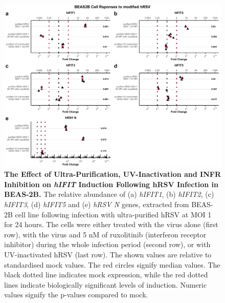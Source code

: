 \begin{figure}
    \centering
    \includegraphics[width=1\linewidth]{06. Chapter 1/Figs/01. Induction/10. beas2b_hrsv.pdf}
    \caption[The Effect of Ultra-Purification, UV-Inactivation and INFR Inhibition on \textit{hIFIT} Induction Following hRSV Infection in BEAS-2B.]{\textbf{The Effect of Ultra-Purification, UV-Inactivation and INFR Inhibition on \textit{hIFIT} Induction Following hRSV Infection in BEAS-2B.} The relative abundance of (a) \textit{hIFIT1}, (b) \textit{hIFIT2}, (c) \textit{hIFIT3}, (d) \textit{hIFIT5} and (e) \textit{hRSV N} genes, extracted from BEAS-2B cell line following infection with ultra-purified hRSV at MOI 1 for 24 hours. The cells were either treated with the virus alone (first row), with the virus and 5 nM of ruxolitinib (interferon receptor inhibitor) during the whole infection period (second row), or with UV-inactivated hRSV (last row). The shown values are relative to standardised mock values. The red circles signify median values. The black dotted line indicates mock expression, while the red dotted lines indicate biologically significant levels of induction. Numeric values signify the p-values compared to mock.}
    \label{The effect of ultra-purification, UV-inactivation and INFR inhibition on hIFIT induction following hRSV infection in BEAS-2B}
\end{figure}

